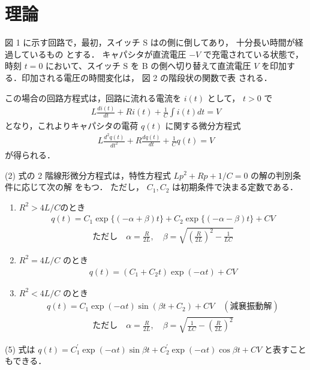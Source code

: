 
\section{理論}

図 1 に示す回路で，最初，スイッチ S はの側に倒してあり，
十分長い時間が経過しているもの とする．
キャパシタが直流電圧 $-V$ で充電されている状態で，
時刻 $t=0$ において、スイッチ S を B 
の側へ切り替えて直流電圧 $V$ を印加する．印加される電圧の時間変化は，
図 2 の階段状の関数で表 される．

この場合の回路方程式は，回路に流れる電流を $i(t)$ として， $t>0$ で
\begin{align}
    L \frac{d i(t)}{d t}+R i(t)+\frac{1}{C} \int i(t) d t=V
\end{align}
となり，これよりキャパシタの電荷 $q(t)$ に関する微分方程式
\begin{align}
    L \frac{d^2 q(t)}{d t^2}+R \frac{d q(t)}{d t}+\frac{1}{C} q(t)=V
\end{align}
が得られる．

(2) 式の 2 階線形微分方程式は，特性方程式 $L p^2+R p+1 / C=0$ 
の解の判別条件に応じて次の解 をもつ．
ただし， $C_1, C_2$ は初期条件で決まる定数である．

\begin{enumerate}
    \item $R^2>4L/C$のとき
        \begin{align}
            q(t)=C_1 \exp \{(-\alpha+\beta) t\}+C_2 \exp \{(-\alpha-\beta) t\}+C V
        \end{align}
        \begin{align*}
            ただし \quad \alpha=\frac{R}{2 L}, \quad \beta=\sqrt{\left(\frac{R}{2 L}\right)^2-\frac{1}{L C}}
        \end{align*}

    \item $R^2=4 L / C$ のとき
        \begin{align}
            q(t)=\left(C_1+C_2 t\right) \exp (-\alpha t)+C V
        \end{align}

    \item $R^2<4 L / C$ のとき
        \begin{align}
            q(t)=C_1 \exp (-\alpha t) \sin \left(\beta t+C_2\right)+C V\quad(減㐮振動解)
        \end{align}
        \begin{align*}
            ただし \quad \alpha=\frac{R}{2 L}, \quad \beta=\sqrt{\frac{1}{L C}-\left(\frac{R}{2 L}\right)^2}
        \end{align*}
\end{enumerate}

(5) 式は $q(t)=C_1^{\prime} \exp (-\alpha t) \sin \beta t+C_2^{\prime} \exp (-\alpha t) \cos \beta t+C V$
 と表すこともできる．